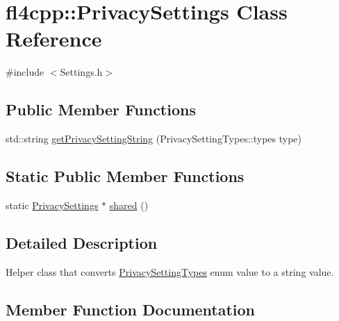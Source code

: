 \hypertarget{classfl4cpp_1_1_privacy_settings}{}\section{fl4cpp\+:\+:Privacy\+Settings Class Reference}
\label{classfl4cpp_1_1_privacy_settings}


{\ttfamily \#include $<$Settings.\+h$>$}

\subsection*{Public Member Functions}
\begin{DoxyCompactItemize}
\item 
std\+::string \hyperlink{classfl4cpp_1_1_privacy_settings_a04faefa1618b25088f0b92986847ced0}{get\+Privacy\+Setting\+String} (Privacy\+Setting\+Types\+::types type)
\end{DoxyCompactItemize}
\subsection*{Static Public Member Functions}
\begin{DoxyCompactItemize}
\item 
static \hyperlink{classfl4cpp_1_1_privacy_settings}{Privacy\+Settings} $\ast$ \hyperlink{classfl4cpp_1_1_privacy_settings_aa186bd0bdb22036ba97ca67a3c6dbc20}{shared} ()
\end{DoxyCompactItemize}


\subsection{Detailed Description}
Helper class that converts \hyperlink{namespacefl4cpp_1_1_privacy_setting_types}{Privacy\+Setting\+Types} enum value to a string value. 

\subsection{Member Function Documentation}
